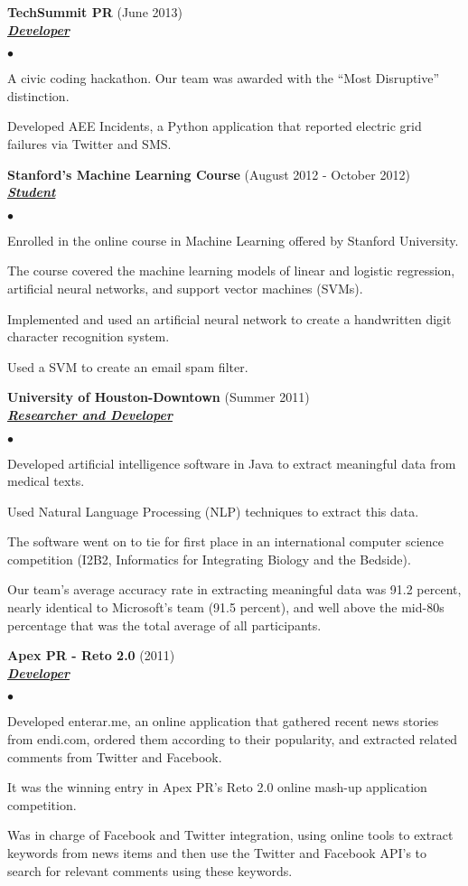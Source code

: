 \documentclass{article}
\newcommand{\employer}[3]{{ \textbf{#1} (#2)\\ \underline{\textbf{\emph{#3}}}\\  }}
\newenvironment{achievements}{\begin{list}{$\bullet$}{\topsep 0pt \itemsep -2pt}}{\vspace*{4pt}\end{list}}
\begin{document}
\employer{TechSummit PR}{June 2013}{Developer}
	\begin{achievements}
	\item A civic coding hackathon. Our team was awarded with the ``Most Disruptive'' distinction.
	\item Developed AEE Incidents, a Python application that reported electric grid failures via Twitter and SMS.
	\end{achievements}

\employer{Stanford's Machine Learning Course}{August 2012 - October 2012}{Student}
	\begin{achievements}
	\item Enrolled in the online course in Machine Learning offered by Stanford University.
	\item The course covered the machine learning models of linear and logistic regression, artificial neural networks, and support vector machines (SVMs).
	\item Implemented and used an artificial neural network to create a handwritten digit character recognition system.
	\item Used a SVM to create an email spam filter.   	
	\end{achievements}

\employer{University of Houston-Downtown}{Summer 2011}{Researcher and Developer}
	\begin{achievements}
	\item Developed artificial intelligence software in Java to extract meaningful data from medical texts.
	\item Used Natural Language Processing (NLP) techniques to extract this data. 	
	\item The software went on to tie for first place in an international computer science competition (I2B2, Informatics for Integrating Biology and the Bedside).
	\item Our team's average accuracy rate in extracting meaningful data was 91.2 percent, nearly identical to Microsoft's team (91.5 percent), and well above the mid-80s percentage that was the total average of all participants.
 	\end{achievements}

\employer{Apex PR - Reto 2.0}{2011}{Developer}
	\begin{achievements}
	\item Developed enterar.me, an online application that gathered recent news stories from endi.com, ordered them according to their popularity, and extracted related comments from Twitter and Facebook.	
	\item It was the winning entry in Apex PR's Reto 2.0 online mash-up application competition.
	\item Was in charge of Facebook and Twitter integration, using online tools to extract keywords from news items and then use the Twitter and Facebook API's to search for relevant comments using these keywords.
	\end{achievements}
\end{document}
